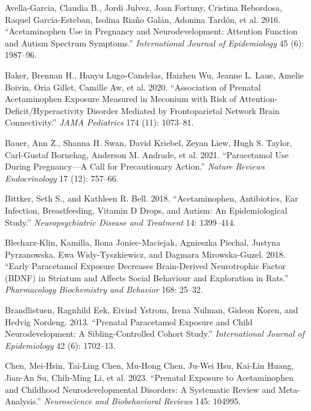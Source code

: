 \documentclass[12pt]{article}
\begin{document}

\begin{thebibliography}{99}

Avella-Garcia, Claudia B., Jordi Julvez, Joan Fortuny, Cristina Rebordosa, Raquel García-Esteban, Isolina Riaño Galán, Adonina Tardón, et al. 2016. ``Acetaminophen Use in Pregnancy and Neurodevelopment: Attention Function and Autism Spectrum Symptoms.'' \textit{International Journal of Epidemiology} 45 (6): 1987--96.

Baker, Brennan H., Hanyu Lugo-Candelas, Haizhen Wu, Jeanne L. Laue, Amelie Boivin, Oria Gillet, Camille Aw, et al. 2020. ``Association of Prenatal Acetaminophen Exposure Measured in Meconium with Risk of Attention-Deficit/Hyperactivity Disorder Mediated by Frontoparietal Network Brain Connectivity.'' \textit{JAMA Pediatrics} 174 (11): 1073--81.

Bauer, Ann Z., Shanna H. Swan, David Kriebel, Zeyan Liew, Hugh S. Taylor, Carl-Gustaf Bornehag, Anderson M. Andrade, et al. 2021. ``Paracetamol Use During Pregnancy---A Call for Precautionary Action.'' \textit{Nature Reviews Endocrinology} 17 (12): 757--66.

Bittker, Seth S., and Kathleen R. Bell. 2018. ``Acetaminophen, Antibiotics, Ear Infection, Breastfeeding, Vitamin D Drops, and Autism: An Epidemiological Study.'' \textit{Neuropsychiatric Disease and Treatment} 14: 1399--414.

Blecharz-Klin, Kamilla, Ilona Joniec-Maciejak, Agnieszka Piechal, Justyna Pyrzanowska, Ewa Widy-Tyszkiewicz, and Dagmara Mirowska-Guzel. 2018. ``Early Paracetamol Exposure Decreases Brain-Derived Neurotrophic Factor (BDNF) in Striatum and Affects Social Behaviour and Exploration in Rats.'' \textit{Pharmacology Biochemistry and Behavior} 168: 25--32.

Brandlistuen, Ragnhild Eek, Eivind Ystrom, Irena Nulman, Gideon Koren, and Hedvig Nordeng. 2013. ``Prenatal Paracetamol Exposure and Child Neurodevelopment: A Sibling-Controlled Cohort Study.'' \textit{International Journal of Epidemiology} 42 (6): 1702--13.

Chen, Mei-Hsin, Tai-Ling Chen, Mu-Hong Chen, Ju-Wei Hsu, Kai-Lin Huang, Jian-An Su, Chih-Ming Li, et al. 2023. ``Prenatal Exposure to Acetaminophen and Childhood Neurodevelopmental Disorders: A Systematic Review and Meta-Analysis.'' \textit{Neuroscience and Biobehavioral Reviews} 145: 104995.


\end{thebibliography}
\end{document}
